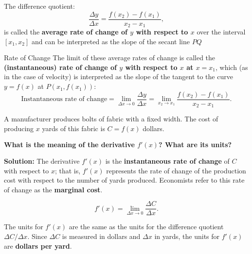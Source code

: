 \documentclass[12pt]{article}
\theoremstyle{beautifulthm}
\begin{document}
The difference quotient:
\[
\frac{\Delta y}{\Delta x} = \frac{f(x_2) - f(x_1)}{x_2 - x_1},
\]
is called the \textbf{average rate of change of \(y\) with respect to \(x\)} over the interval \([x_1, x_2]\) and can be interpreted as the slope of the secant line \(PQ\)



\bigskip




\begin{Definition}{ Rate of Change}{}
The limit of these average rates of change is called the \textbf{(instantaneous) rate of change of \(y\) with respect to \(x\) at \(x = x_1\)}, which (as in the case of velocity) is interpreted as the slope of the tangent to the curve \(y = f(x)\) at \(P(x_1, f(x_1))\):
\[
\text{Instantaneous rate of change} = \lim_{\Delta x \to 0} \frac{\Delta y}{\Delta x} = \lim_{x_2 \to x_1} \frac{f(x_2) - f(x_1)}{x_2 - x_1}.
\]


\end{Definition}


\begin{tcolorbox}[colback=examplebg, colframe=red!75!black, title=\textbf{EXAMPLE 2:Understanding the Derivative in a Practical Context}, fonttitle=\bfseries, sharp corners]
A manufacturer produces bolts of fabric with a fixed width. The cost of producing \(x\) yards of this fabric is \(C = f(x)\) dollars.

\vspace{3mm}
\textbf{ What is the meaning of the derivative \(f'(x)\)? What are its units?}
\vspace{5mm}
\tcblower

\textbf{Solution:} The derivative \(f'(x)\) is the \textbf{instantaneous rate of change} of \(C\) with respect to \(x\); that is, \(f'(x)\) represents the rate of change of the production cost with respect to the number of yards produced. Economists refer to this rate of change as the \textbf{marginal cost}.

\[
f'(x) = \lim_{\Delta x \to 0} \frac{\Delta C}{\Delta x}.
\]

The units for \(f'(x)\) are the same as the units for the difference quotient \(\Delta C / \Delta x\). Since \(\Delta C\) is measured in dollars and \(\Delta x\) in yards, the units for \(f'(x)\) are \textbf{dollars per yard}.

\end{tcolorbox}




\newpage
\end{document}
